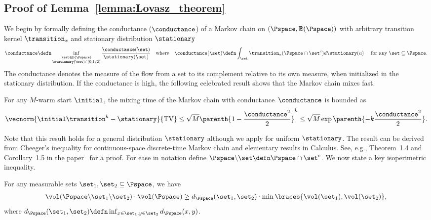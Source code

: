 \subsection{Proof of Lemma~\ref{lemma:Lovasz_theorem}} %
\label{sub:proof_of_lemma_lemma:lovasz_theorem}
We begin by formally defining the conductance ($\conductance$) of a Markov chain on $(\Pspace, \mathbb{B}(\Pspace))$ with arbitrary transition kernel $\transition_x$ and stationary distribution $\stationary$
\begin{align*}
	\conductance
	\defn \inf_{\substack{\set \in \mathbb{B}(\Pspace)\\ \stationary(\set) \in (0, 1/2)}} \frac{\conductance(\set)}{\stationary(\set)}
	\quad \text{where} \quad
	\conductance(\set) \defn \int_\set \transition_u(\Pspace \cap \set^c) d\stationary(u)
	\quad \text{ for any } \set \subseteq \Pspace.
\end{align*}
The conductance denotes the measure of the flow from a set to its complement relative to its own measure, when initialized in the stationary distribution.
If the conductance is high, the following celebrated result shows that the Markov chain mixes fast.
\begin{lemma}
	\label{lemma:conductance_mixing}
	For any $M$-warm start $\initial$, the mixing time of the Markov chain with conductance~$\conductance$ is bounded as
	\begin{align*}
		\vecnorm{\initial\transition^k-\stationary}{\text{TV}} \leq \sqrt{M} \parenth{1-\frac{\conductance^2}{2}}^k \leq \sqrt{M} \exp\parenth{-k\frac{\conductance^2}{2} }.
	\end{align*}
\end{lemma}
Note that this result holds for a general distribution $\stationary$ although we apply  for uniform $\stationary$.
The result can be derived from Cheeger's inequality for continuous-space discrete-time Markov chain and elementary results in Calculus.
See, e.g., Theorem~1.4 and Corollary~1.5 in the paper~\cite{lovasz1993random} for a proof.
For ease in notation define $\Pspace \backslash \set \defn \Pspace \cap \set^c$.
We now state a key isoperimetric inequality.
\begin{lemma}
	\label{lemma:isoperimetry}
	For any measurable sets $\set_1, \set_2 \subseteq \Pspace$, we have
	\begin{align*}
		\vol(\Pspace \backslash \set_1  \backslash \set_2) \cdot  \vol(\Pspace)
		\geq d_\Pspace(\set_1, \set_2) \cdot \min\braces{\vol(\set_1), \vol(\set_2)},
	\end{align*}
	where $d_\Pspace(\set_1, \set_2) \defn \inf_{x \in \set_1, y \in \set_2} d_\Pspace(x, y)$.
\end{lemma}
